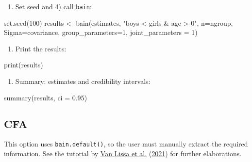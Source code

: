 \documentclass[
]{book}
\newenvironment{Shaded}{\begin{snugshade}}{\end{snugshade}}
\newcommand{\AttributeTok}[1]{\textcolor[rgb]{0.77,0.63,0.00}{#1}}
\newcommand{\DecValTok}[1]{\textcolor[rgb]{0.00,0.00,0.81}{#1}}
\newcommand{\FloatTok}[1]{\textcolor[rgb]{0.00,0.00,0.81}{#1}}
\newcommand{\FunctionTok}[1]{\textcolor[rgb]{0.00,0.00,0.00}{#1}}
\newcommand{\NormalTok}[1]{#1}
\newcommand{\OtherTok}[1]{\textcolor[rgb]{0.56,0.35,0.01}{#1}}
\newcommand{\StringTok}[1]{\textcolor[rgb]{0.31,0.60,0.02}{#1}}
\providecommand{\tightlist}{%
  \setlength{\itemsep}{0pt}\setlength{\parskip}{0pt}}
\begin{document}
\begin{enumerate}
\def\labelenumi{\arabic{enumi})}
\setcounter{enumi}{2}
\tightlist
\item
  Set seed and 4) call \texttt{bain}:
\end{enumerate}

\begin{Shaded}
\begin{Highlighting}[]
\FunctionTok{set.seed}\NormalTok{(}\DecValTok{100}\NormalTok{)}
\NormalTok{results }\OtherTok{\textless{}{-}} \FunctionTok{bain}\NormalTok{(estimates, }\StringTok{"boys \textless{} girls \& age \textgreater{} 0"}\NormalTok{, }\AttributeTok{n=}\NormalTok{ngroup,}
\AttributeTok{Sigma=}\NormalTok{covariance, }\AttributeTok{group\_parameters=}\DecValTok{1}\NormalTok{, }\AttributeTok{joint\_parameters =} \DecValTok{1}\NormalTok{)}
\end{Highlighting}
\end{Shaded}

\begin{enumerate}
\def\labelenumi{\arabic{enumi})}
\setcounter{enumi}{4}
\tightlist
\item
  Print the results:
\end{enumerate}

\begin{Shaded}
\begin{Highlighting}[]
\FunctionTok{print}\NormalTok{(results)}
\end{Highlighting}
\end{Shaded}

\begin{enumerate}
\def\labelenumi{\arabic{enumi})}
\setcounter{enumi}{5}
\tightlist
\item
  Summary: estimates and credibility intervals:
\end{enumerate}

\begin{Shaded}
\begin{Highlighting}[]
\FunctionTok{summary}\NormalTok{(results, }\AttributeTok{ci =} \FloatTok{0.95}\NormalTok{)}
\end{Highlighting}
\end{Shaded}

\hypertarget{cfa}{%
\subsection{CFA}\label{cfa}}

This option uses \texttt{bain.default()}, so the user must manually extract the required information. See the tutorial by \protect\hyperlink{ref-van2021teacher}{Van Lissa et al.} (\protect\hyperlink{ref-van2021teacher}{2021}) for further elaborations.
\end{document}
